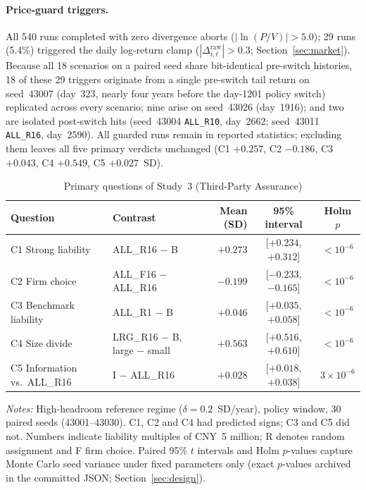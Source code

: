 \documentclass[11pt]{article}
\begin{document}
\paragraph{Price-guard triggers.} All 540 runs completed with zero divergence aborts ($|\ln(P/V)| > 5.0$); 29 runs (5.4\%) triggered the daily log-return clamp ($|\Delta^{\mathrm{raw}}_{i,t}| > 0.3$; Section~\ref{sec:market}). Because all 18 scenarios on a paired seed share bit-identical pre-switch histories, 18 of these 29 triggers originate from a single pre-switch tail return on seed~43007 (day~323, nearly four years before the day-1201 policy switch) replicated across every scenario; nine arise on seed~43026 (day~1916); and two are isolated post-switch hits (seed~43004 \texttt{ALL\_R10}, day~2662; seed~43011 \texttt{ALL\_R16}, day~2590). All guarded runs remain in reported statistics; excluding them leaves all five primary verdicts unchanged (C1 $+0.257$, C2 $-0.186$, C3 $+0.043$, C4 $+0.549$, C5 $+0.027$~SD).

\begin{table}[t]
\centering
\small
\begin{threeparttable}
\caption{Primary questions of Study~3 (Third-Party Assurance)}
\label{tab:assurance_primary}
\begin{tabular}{@{}llrcc@{}}
\toprule
Question & Contrast & Mean (SD) & 95\% interval & Holm $p$ \\
\midrule
C1 Strong liability & ALL\_R16 $-$ B & $+0.273$ & [$+0.234$, $+0.312$] & $< 10^{-6}$ \\
C2 Firm choice & ALL\_F16 $-$ ALL\_R16 & $-0.199$ & [$-0.233$, $-0.165$] & $< 10^{-6}$ \\
C3 Benchmark liability & ALL\_R1 $-$ B & $+0.046$ & [$+0.035$, $+0.058$] & $< 10^{-6}$ \\
C4 Size divide & LRG\_R16 $-$ B, large $-$ small & $+0.563$ & [$+0.516$, $+0.610$] & $< 10^{-6}$ \\
C5 Information vs.\ ALL\_R16 & I $-$ ALL\_R16 & $+0.028$ & [$+0.018$, $+0.038$] & $3\times10^{-6}$ \\
\bottomrule
\end{tabular}
\begin{tablenotes}[flushleft]\footnotesize
\item \textit{Notes:} High-headroom reference regime ($\delta = 0.2$~SD/year), policy window, 30 paired seeds (43001--43030). C1, C2 and C4 had predicted signs; C3 and C5 did not. Numbers indicate liability multiples of CNY~5 million; R denotes random assignment and F firm choice. Paired 95\% $t$ intervals and Holm $p$-values capture Monte Carlo seed variance under fixed parameters only (exact $p$-values archived in the committed JSON; Section~\ref{sec:design}).
\end{tablenotes}
\end{threeparttable}
\end{table}
\end{document}
